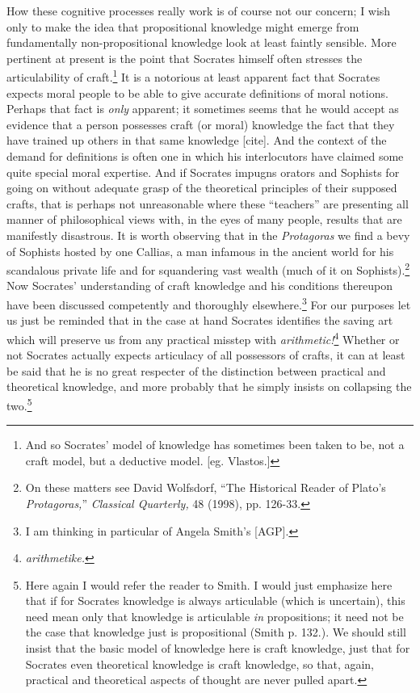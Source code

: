 \documentclass[11pt]{amsart}
\begin{document}
How these cognitive processes really work is of course not our concern; I wish only to make the idea that propositional knowledge might emerge from fundamentally non-propositional knowledge look at least faintly sensible. More pertinent at present is the point that Socrates himself often stresses the articulability of craft.\footnote{And so Socrates' model of knowledge has sometimes been taken to be, not a craft model, but a deductive model. [eg. Vlastos.]} It is a notorious at least apparent fact that Socrates expects moral people to be able to give accurate definitions of moral notions. Perhaps that fact is \emph{only} apparent; it sometimes seems that he would accept as evidence that a person possesses craft  (or moral) knowledge the fact that they have trained up others in that same knowledge [cite]. And the context of the demand for definitions is often one in which his interlocutors have claimed some quite special moral expertise. And if Socrates impugns orators and Sophists for going on without adequate grasp of the theoretical principles of their supposed crafts, that is perhaps not unreasonable where these ``teachers'' are presenting all manner of philosophical views with, in the eyes of many people, results that are manifestly disastrous. It is worth observing that in the \emph{Protagoras} we find a bevy of Sophists hosted by one Callias, a man infamous in the ancient world for his scandalous private life and for squandering vast wealth (much of it on Sophists).\footnote{On these matters see David Wolfsdorf, ``The Historical Reader of Plato's \emph{Protagoras,}'' \emph{Classical Quarterly,} 48 (1998), pp. 126-33.} Now Socrates' understanding of craft knowledge and his conditions thereupon have been discussed competently and thoroughly elsewhere.\footnote{I am thinking in particular of Angela Smith's [AGP].} For our purposes let us just be reminded that in the case at hand Socrates identifies the saving art which will preserve us from any practical misstep with \emph{arithmetic!}\footnote{\emph{arithmetike.}} Whether or not Socrates actually expects articulacy of all possessors of crafts, it can at least be said that he is no great respecter of the distinction between practical and theoretical knowledge, and more probably that he simply insists on collapsing the two.\footnote{Here again I would refer the reader to Smith. I would just emphasize here that if for Socrates knowledge is always articulable (which is uncertain), this need mean only that knowledge is articulable \emph{in} propositions; it need not be the case that knowledge just is propositional (Smith p. 132.). We should still insist that the basic model of knowledge here is craft knowledge, just that for Socrates even theoretical knowledge is craft knowledge, so that, again, practical and theoretical aspects of thought are never pulled apart.}
\end{document}
